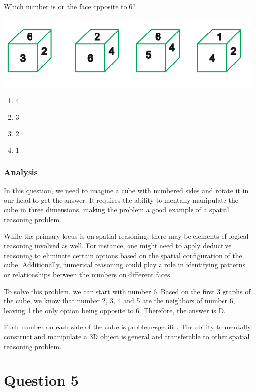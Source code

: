 \documentclass[12pt, a4paper]{article}
\begin{document}
Which number is on the face opposite to 6?

\includegraphics[width=1\textwidth]{Figure.4.5.png}

\begin{enumerate}[label=(\Alph*)]
    \item 4
    \item 3
    \item 2
    \item 1
\end{enumerate}

\subsubsection*{Analysis}
In this question, we need to imagine a cube with numbered sides and rotate it in our head to get the answer. It requires the ability to mentally manipulate the cube in three dimensions, making the problem a good example of a spatial reasoning problem.

While the primary focus is on spatial reasoning, there may be elements of logical reasoning involved as well. For instance, one might need to apply deductive reasoning to eliminate certain options based on the spatial configuration of the cube. Additionally, numerical reasoning could play a role in identifying patterns or relationships between the numbers on different faces.

To solve this problem, we can start with number 6. Based on the first 3 graphs of the cube, we know that number 2, 3, 4 and 5 are the neighbors of number 6, leaving 1 the only option being opposite to 6. Therefore, the answer is D.

Each number on each side of the cube is problem-specific. The ability to mentally construct and manipulate a 3D object is general and transferable to other spatial reasoning problem.

\newpage
\section*{Question 5}
\end{document}
